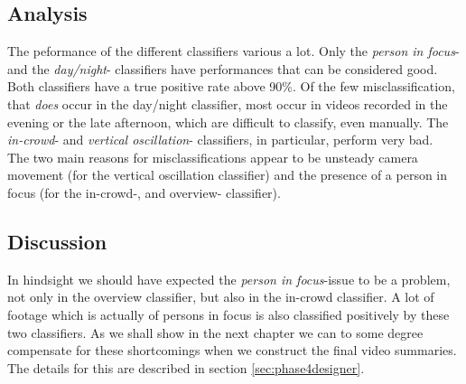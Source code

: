\subsection{Analysis}
%
The peformance of the different classifiers various a lot. Only the \textit{person in focus}- and the \textit{day/night}- classifiers have performances that can be considered good. Both classifiers have a true positive rate above 90\%. Of the few misclassification, that \textit{does} occur in the day/night classifier, most occur in videos recorded in the evening or the late afternoon, which are difficult to classify, even manually. The \textit{in-crowd}- and \textit{vertical oscillation}- classifiers, in particular, perform very bad.\\
The two main reasons for misclassifications appear to be unsteady camera movement (for the vertical oscillation classifier) and the presence of a person in focus (for the in-crowd-, and overview- classifier).
%
\subsection{Discussion}\label{sec:phase2discussion}
%
In hindsight we should have expected the \textit{person in focus}-issue to be a problem, not only in the overview classifier, but also in the in-crowd classifier. A lot of footage which is actually of persons in focus is also classified positively by these two classifiers. As we shall show in the next chapter we can to some degree compensate for these shortcomings when we construct the final video summaries. The details for this are described in section \ref{sec:phase4designer}.
%
